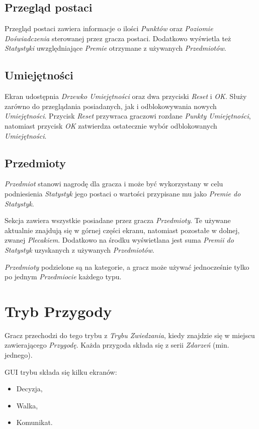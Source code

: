 \documentclass[openright]{xmgr}
\begin{document}
\subsection*{Przegląd postaci}
Przegląd postaci zawiera informacje o ilości \textit{Punktów} oraz \textit{Poziomie Doświadczenia} sterowanej przez gracza postaci. Dodatkowo wyświetla też \textit{Statystyki} uwzględniające \textit{Premie} otrzymane z używanych \textit{Przedmiotów}.
\subsection*{Umiejętności}
Ekran udostępnia \textit{Drzewko Umiejętności} oraz dwa przyciski \textit{Reset} i \textit{OK}. Służy zarówno do przeglądania posiadanych, jak i odblokowywania nowych \textit{Umiejętności}. Przycisk \textit{Reset} przywraca graczowi rozdane \textit{Punkty Umiejętności}, natomiast przycisk \textit{OK} zatwierdza ostatecznie wybór odblokowanych \textit{Umiejętności}.
\subsection*{Przedmioty}
\textit{Przedmiot} stanowi nagrodę dla gracza i może być wykorzystany w celu podniesienia \textit{Statystyk} jego postaci o wartości przypisane mu jako \textit{Premie do Statystyk}.

Sekcja zawiera wszystkie posiadane przez gracza \textit{Przedmioty}. Te używane aktualnie znajdują się w górnej części ekranu, natomiast pozostałe w dolnej, zwanej \textit{Plecakiem}. Dodatkowo na środku wyświetlana jest suma \textit{Premii do Statystyk} uzyskanych z używanych \textit{Przedmiotów}.

\textit{Przedmioty} podzielone są na kategorie, a gracz może używać jednocześnie tylko po jednym \textit{Przedmiocie} każdego typu.
\section{Tryb Przygody}

Gracz przechodzi do tego trybu z \textit{Trybu Zwiedzania}, kiedy znajdzie się w miejscu zawierającego \textit{Przygodę}. Każda przygoda składa się z serii \textit{Zdarzeń} (min. jednego).

GUI trybu składa się kilku ekranów:
\begin{itemize}
	\item Decyzja,
	\item Walka,
	\item Komunikat.
\end{itemize}
\end{document}
